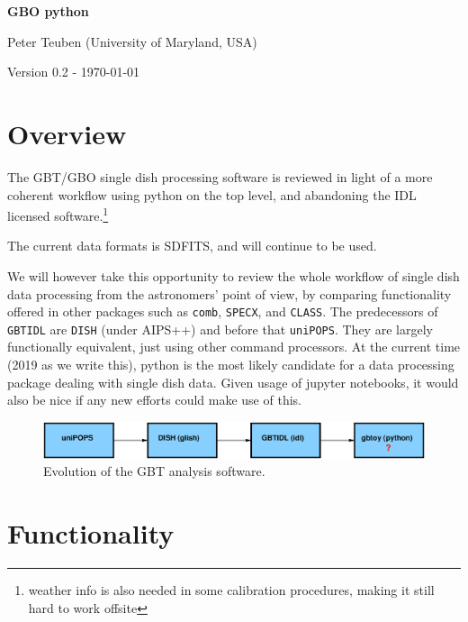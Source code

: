 \documentclass[12pt,a4paper]{article}
\begin{document}
\pagestyle{plain}
 

\begin{center}
{\Large{\bf{  GBO python  \\  }}} 

\end{center}
\bigskip

\centerline{Peter Teuben (University of Maryland, USA)}

\centerline{Version 0.2 - \today}
\bigskip

\section{Overview}

The GBT/GBO single dish processing software is reviewed in light of
a more coherent workflow using python on the top level, and abandoning the
IDL licensed software.\footnote{weather info is also needed in some
  calibration procedures, making it still hard to work offsite}

The current data formats is SDFITS, and will continue to be used.

We will however take this opportunity to review the whole workflow of
single dish data processing from the astronomers' point of view, by
comparing functionality offered in other packages such as {\tt comb},
{\tt SPECX}, and {\tt CLASS}. The predecessors of {\tt GBTIDL} are
{\tt DISH} (under AIPS++) and before that {\tt uniPOPS}. They are largely
functionally equivalent, just using other command processors. At the
current time (2019 as we write this), python is the most likely
candidate for a data processing package dealing with single dish
data. Given usage of jupyter notebooks, it would also be nice if any
new efforts could make use of this.

\begin{figure}[h]
\centering
  \includegraphics[width=\textwidth]{fig1.eps}
\caption{\label{fig1} Evolution of the GBT analysis software.}
\end{figure}

\section{Functionality}
\end{document}
